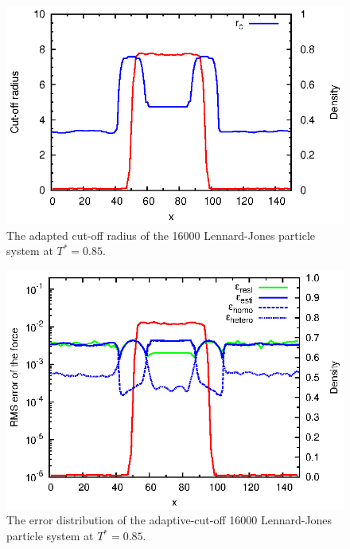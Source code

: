 \documentclass[aps,pre,preprint]{revtex4}
\begin{document}
\begin{figure}
  \centering
  \includegraphics[]{fig/t0.85-n16000-adapt-e0.0045-extend/rcut.adapt.eps}
  \caption{The adapted cut-off radius of the 16000 Lennard-Jones
    particle system at $T^\ast=0.85$.}
  \label{fig:tmp2}
\end{figure}


\begin{figure}
  \centering
  \includegraphics[]{fig/t0.85-n16000-adapt-e0.0045-extend/error.adapt.eps}
  \caption{The error distribution of the adaptive-cut-off 16000
    Lennard-Jones particle system at $T^\ast=0.85$.}
  \label{fig:tmp3}
\end{figure}
\end{document}
